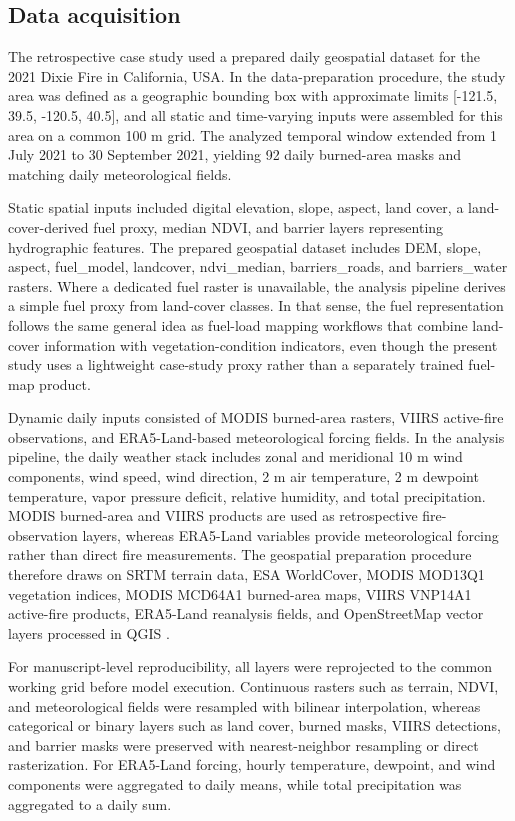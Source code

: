\documentclass[10pt,letterpaper]{article}
\begin{document}
\subsection*{Data acquisition}

The retrospective case study used a prepared daily geospatial dataset
for the 2021 Dixie Fire in California, USA. In the data-preparation procedure, the
study area was defined as a geographic bounding box with approximate
limits {[}-121.5, 39.5, -120.5, 40.5{]}, and all static and time-varying
inputs were assembled for this area on a common 100 m grid. The
analyzed temporal window extended from 1 July 2021 to 30 September 2021,
yielding 92 daily burned-area masks and matching daily meteorological
fields.

Static spatial inputs included digital elevation, slope, aspect, land
cover, a land-cover-derived fuel proxy, median NDVI, and barrier layers
representing hydrographic features. The prepared geospatial dataset
includes DEM, slope, aspect, fuel\_model, landcover, ndvi\_median,
barriers\_roads, and barriers\_water rasters. Where a dedicated fuel raster is unavailable, the analysis pipeline
derives a simple fuel proxy from land-cover classes.
In that sense, the fuel representation follows the same general idea as
fuel-load mapping workflows that combine land-cover information with
vegetation-condition indicators, even though the present study uses a
lightweight case-study proxy rather than a separately trained fuel-map
product.

Dynamic daily inputs consisted of MODIS burned-area rasters, VIIRS
active-fire observations, and ERA5-Land-based meteorological forcing
fields. In the analysis pipeline, the daily weather stack includes
zonal and meridional 10 m wind components, wind speed, wind direction, 2
m air temperature, 2 m dewpoint temperature, vapor pressure deficit,
relative humidity, and total precipitation. MODIS burned-area and VIIRS
products are used as retrospective fire-observation layers, whereas
ERA5-Land variables provide meteorological forcing rather than direct
fire measurements. The geospatial preparation procedure therefore draws
on SRTM terrain data, ESA WorldCover, MODIS MOD13Q1 vegetation indices,
MODIS MCD64A1 burned-area maps, VIIRS VNP14A1 active-fire products,
ERA5-Land reanalysis fields, and OpenStreetMap vector layers processed
in QGIS \cite{earthdata2025b,worldcover2020,earthdata2025a,mcd64a1dataset,earthdata2025c,era5land,geofabrik,qgissoftware}.

For manuscript-level reproducibility, all layers were reprojected to the
common working grid before model execution. Continuous rasters
such as terrain, NDVI, and meteorological fields were resampled with
bilinear interpolation, whereas categorical or binary layers such as
land cover, burned masks, VIIRS detections, and barrier masks were
preserved with nearest-neighbor resampling or direct rasterization. For
ERA5-Land forcing, hourly temperature, dewpoint, and wind components
were aggregated to daily means, while total precipitation was aggregated
to a daily sum.
\end{document}
